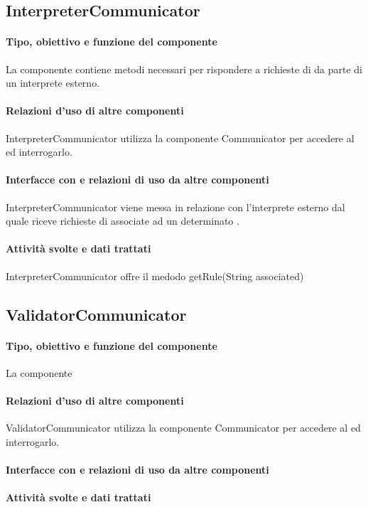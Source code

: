 \documentclass[11pt,titlepage,a4paper]{report}
\begin{document}
\subsection{InterpreterCommunicator}
\paragraph{Tipo, obiettivo e funzione del componente}
La componente contiene metodi necessari per rispondere a richieste di \br da parte di un interprete esterno.
\paragraph{Relazioni d'uso di altre componenti}
InterpreterCommunicator utilizza la componente Communicator per accedere al \re ed interrogarlo.
\paragraph{Interfacce con e relazioni di uso da altre componenti}
InterpreterCommunicator viene messa in relazione con l'interprete esterno dal quale riceve richieste di \brs associate ad un determinato \bo.
\paragraph{Attivit\`a svolte e dati trattati}
InterpreterCommunicator offre il medodo getRule(String associated)


\subsection{ValidatorCommunicator}
\paragraph{Tipo, obiettivo e funzione del componente}
La componente
\paragraph{Relazioni d'uso di altre componenti}
ValidatorCommunicator utilizza la componente Communicator per accedere al \re ed interrogarlo.
\paragraph{Interfacce con e relazioni di uso da altre componenti}
\paragraph{Attivit\`a svolte e dati trattati}
\end{document}
